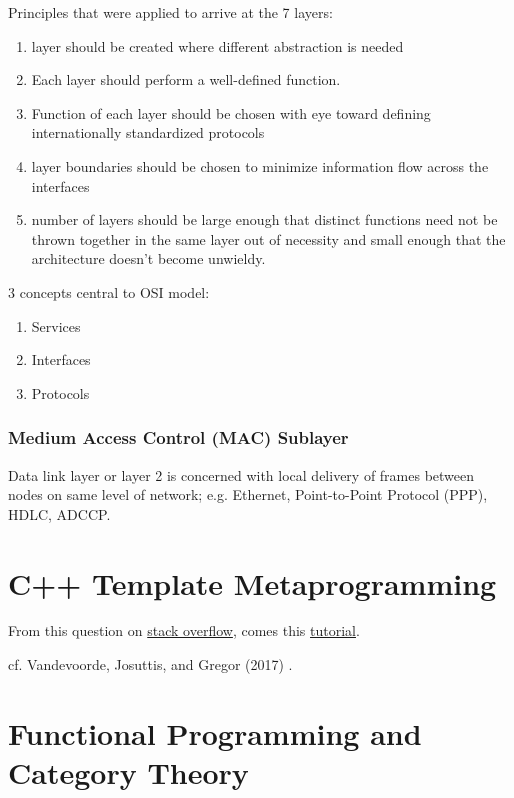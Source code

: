 \documentclass[10pt]{amsart}
\begin{document}
\begin{multicols*}{2}
Principles that were applied to arrive at the 7 layers:
\begin{enumerate}
	\item layer should be created where different abstraction is needed
	\item Each layer should perform a well-defined function.
	\item Function of each layer should be chosen with eye toward defining internationally standardized protocols
	\item layer boundaries should be chosen to minimize information flow across the interfaces
	\item number of layers should be large enough that distinct functions need not be thrown together in the same layer out of necessity and small enough that the architecture doesn't become unwieldy.
\end{enumerate}

3 concepts central to OSI model:
\begin{enumerate}
	\item Services
	\item Interfaces
	\item Protocols
\end{enumerate}

\section{Medium Access Control (MAC) Sublayer}

Data link layer or layer 2 is concerned with local delivery of frames between nodes on same level of network; e.g. Ethernet, Point-to-Point Protocol (PPP), HDLC, ADCCP.



\part{C++ Template Metaprogramming}

From this question on \href{https://stackoverflow.com/questions/112277/best-introduction-to-c-template-metaprogramming}{stack overflow}, comes this \href{http://www.cs.rpi.edu/~musser/design/blitz/meta-art.html}{tutorial}. 

cf. Vandevoorde, Josuttis, and Gregor (2017) \cite{VJG2017}. 

\part{Functional Programming and Category Theory}


\end{multicols*}
\end{document}
